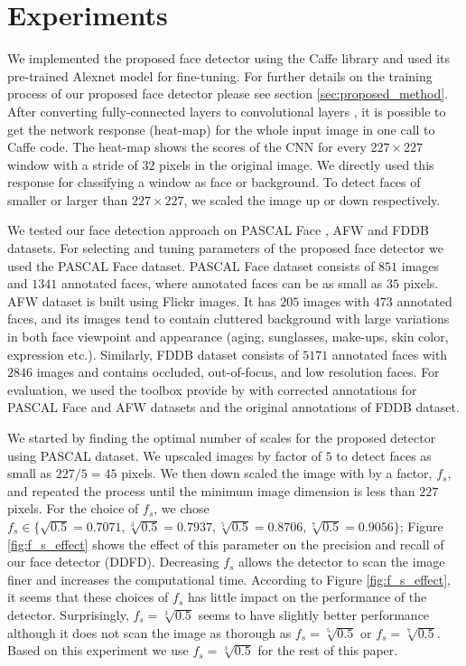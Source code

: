 \documentclass{sig-alternate-2013}
\begin{document}
\section{Experiments}

We implemented the proposed face detector using the Caffe library \cite{caffe} and used its pre-trained Alexnet \cite{alex-net} model for fine-tuning. For further details on the training process of our proposed face detector please see section \ref{sec:proposed_method}. After converting fully-connected layers to convolutional layers \cite{densenet}, it is possible to get the network response (heat-map) for the whole input image in one call to Caffe code.  The heat-map shows the scores of the CNN for every $227 \times 227$ window with a stride of $32$ pixels in the original image. We directly used this response for classifying a window as face or background. To detect faces of smaller or larger than $227 \times 227$, we scaled the image up or down respectively.
   
We tested our face detection approach on PASCAL Face \cite{structural_model}, AFW \cite{tsm} and FDDB \cite{fddb} datasets. For selecting and tuning parameters of the proposed face detector we used the PASCAL Face dataset.
PASCAL Face dataset consists of $851$ images and $1341$ annotated faces, where annotated faces can be as small as $35$ pixels. AFW dataset is built using Flickr images. It has $205$ images with $473$ annotated faces, and its images tend to contain cluttered background with large variations in both face viewpoint and appearance (aging, sunglasses, make-ups, skin color, expression etc.). Similarly, FDDB dataset \cite{fddb} consists of $5171$ annotated faces with $2846$ images and contains occluded, out-of-focus, and low resolution faces. For evaluation, we used the toolbox provide by \cite{head_hunter} with corrected annotations for PASCAL Face and AFW datasets and the original annotations of FDDB dataset.

We started by finding the optimal number of scales for the proposed detector using PASCAL dataset. We upscaled images by factor of $5$ to detect faces as small as $227/5=45$ pixels. We then down scaled the image with by a factor, $f_s$, and repeated the process until the minimum image dimension is less than $227$ pixels. For the choice of $f_s$, we chose $f_s \in \{ \sqrt{0.5}=0.7071, \sqrt[3]{0.5}=0.7937,  \sqrt[5]{0.5}=0.8706, \sqrt[7]{0.5}=0.9056 \}$; Figure \ref{fig:f_s_effect} shows the effect of this parameter on the precision and recall of our face detector (DDFD). 
Decreasing $f_s$ allows the detector to scan the image finer and increases the computational time. According to Figure \ref{fig:f_s_effect}, it seems that these choices of $f_s$
has little impact on the performance of the detector. Surprisingly, $f_s =  \sqrt[3]{0.5}$ seems to have slightly better performance although it does not scan the image as thorough as $f_s =  \sqrt[5]{0.5}$ or $f_s =\sqrt[7]{0.5}$. Based on this experiment we use $f_s =\sqrt[3]{0.5}$ for the rest of this paper. 
\end{document}
